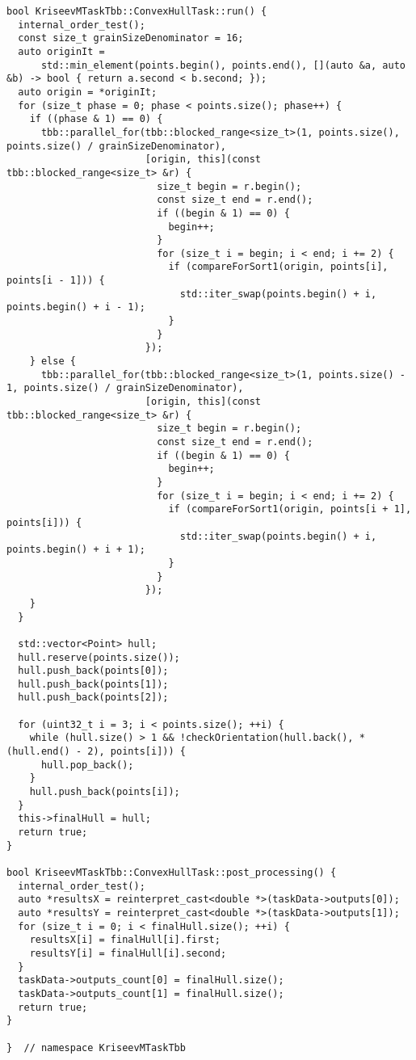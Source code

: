\documentclass[a4paper]{article}
\begin{document}
\begin{lstlisting}
bool KriseevMTaskTbb::ConvexHullTask::run() {
  internal_order_test();
  const size_t grainSizeDenominator = 16;
  auto originIt =
      std::min_element(points.begin(), points.end(), [](auto &a, auto &b) -> bool { return a.second < b.second; });
  auto origin = *originIt;
  for (size_t phase = 0; phase < points.size(); phase++) {
    if ((phase & 1) == 0) {
      tbb::parallel_for(tbb::blocked_range<size_t>(1, points.size(), points.size() / grainSizeDenominator),
                        [origin, this](const tbb::blocked_range<size_t> &r) {
                          size_t begin = r.begin();
                          const size_t end = r.end();
                          if ((begin & 1) == 0) {
                            begin++;
                          }
                          for (size_t i = begin; i < end; i += 2) {
                            if (compareForSort1(origin, points[i], points[i - 1])) {
                              std::iter_swap(points.begin() + i, points.begin() + i - 1);
                            }
                          }
                        });
    } else {
      tbb::parallel_for(tbb::blocked_range<size_t>(1, points.size() - 1, points.size() / grainSizeDenominator),
                        [origin, this](const tbb::blocked_range<size_t> &r) {
                          size_t begin = r.begin();
                          const size_t end = r.end();
                          if ((begin & 1) == 0) {
                            begin++;
                          }
                          for (size_t i = begin; i < end; i += 2) {
                            if (compareForSort1(origin, points[i + 1], points[i])) {
                              std::iter_swap(points.begin() + i, points.begin() + i + 1);
                            }
                          }
                        });
    }
  }

  std::vector<Point> hull;
  hull.reserve(points.size());
  hull.push_back(points[0]);
  hull.push_back(points[1]);
  hull.push_back(points[2]);

  for (uint32_t i = 3; i < points.size(); ++i) {
    while (hull.size() > 1 && !checkOrientation(hull.back(), *(hull.end() - 2), points[i])) {
      hull.pop_back();
    }
    hull.push_back(points[i]);
  }
  this->finalHull = hull;
  return true;
}

bool KriseevMTaskTbb::ConvexHullTask::post_processing() {
  internal_order_test();
  auto *resultsX = reinterpret_cast<double *>(taskData->outputs[0]);
  auto *resultsY = reinterpret_cast<double *>(taskData->outputs[1]);
  for (size_t i = 0; i < finalHull.size(); ++i) {
    resultsX[i] = finalHull[i].first;
    resultsY[i] = finalHull[i].second;
  }
  taskData->outputs_count[0] = finalHull.size();
  taskData->outputs_count[1] = finalHull.size();
  return true;
}

}  // namespace KriseevMTaskTbb
\end{lstlisting}
\end{document}
